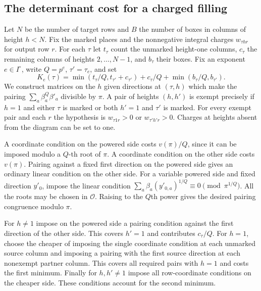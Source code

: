 \subsection{The determinant cost for a charged filling}\label{jets:count}
Let $N$ be the number of target rows and $B$ the number of boxes in columns of height $h<N$. Fix the marked places and the nonnegative integral charges $w_{\tau h r}$ for output row $r$. For each $\tau$ let $t_\tau$ count the unmarked height-one columns, $c_\tau$ the remaining columns of heights $2,\ldots,N-1$, and $b_\tau$ their boxes.
Fix an exponent $e\in I^\circ$, write $Q=p^e$, $\tau'=\tau_e$, and set
\[
 K_e(\tau)=\min(t_\tau/Q,t_{\tau'}+c_{\tau'})
     +c_\tau/Q+\min(b_\tau/Q,b_{\tau'}).
\]
We construct matrices on the $h$ given directions at $(\tau,h)$ which make the pairing $\sum_a \beta_a^Q\beta'_a$ divisible by $\pi$. A pair of heights $(h,h')$ is exempt precisely if $h=1$ and either $\tau$ is marked or both $h'=1$ and $\tau'$ is marked. For every exempt pair and each $r$ the hypothesis is $w_{\tau 1 r}>0$ or $w_{\tau' h'r}>0$. Charges at heights absent from the diagram can be set to one.

A coordinate condition on the powered side costs $v(\pi)/Q$, since it can be imposed modulo a $Q$-th root of $\pi$. A coordinate condition on the other side costs $v(\pi)$. Pairing against a fixed first direction on the powered side gives an ordinary linear condition on the other side. For a variable powered side and fixed direction $y'_0$, impose the linear condition
$\sum_a\beta_a(y'_{0,a})^{1/Q}\equiv0\pmod{\pi^{1/Q}}$.
All the roots may be chosen in $\mathcal O$. Raising to the $Q$th power gives the desired pairing congruence modulo $\pi$.

For $h\ne1$ impose on the powered side a pairing condition against the first direction of the other side. This covers $h'=1$ and contributes $c_\tau/Q$.
For $h=1$, choose the cheaper of imposing the single coordinate condition at each unmarked source column and imposing a pairing with the first source direction at each nonexempt partner column. This covers all required pairs with $h=1$ and costs the first minimum. Finally for $h,h'\ne1$ impose all row-coordinate conditions on the cheaper side. These conditions account for the second minimum.

